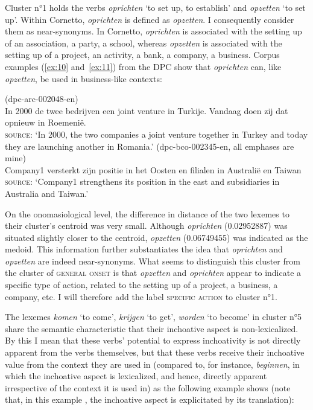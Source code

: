 Cluster n°1 holds the verbs \textit{oprichten} `to set up, to establish' and \textit{opzetten} `to set up'. Within Cornetto, \textit{oprichten} is defined as \textit{opzetten}. I consequently consider them as near-synonyms. In Cornetto, \textit{oprichten} is associated with the setting up of an association, a party, a school, whereas \textit{opzetten} is associated with the setting up of a project, an activity, a bank, a company, a business. Corpus examples (\ref{ex:10} and~\ref{ex:11}) from the DPC show that \textit{oprichten} can, like \textit{opzetten}, be used in business-like contexts:

\ea (dpc-arc-002048-en)\label{ex:10}\\
In 2000  de twee bedrijven een joint venture  in Turkije. Vandaag doen zij dat opnieuw in Roemenië.\smallskip\\\relax
\textsc{source}: `In 2000, the two companies  a joint venture together in Turkey and today they are launching another in Romania.'
\ex (dpc-bco-002345-en, all emphases are mine)\label{ex:11}\\
Company1 versterkt zijn positie in het Oosten en  filialen  in Australië en Taiwan\smallskip\\\relax
\textsc{source}: `Company1 strengthens its position in the east and  subsidiaries in Australia and Taiwan.'
\z

On the onomasiological level, the difference in distance of the two lexemes to their cluster’s centroid was very small. Although \textit{oprichten} (0.02952887) was situated slightly closer to the centroid, \textit{opzetten} (0.06749455) was indicated as the medoid. This information further substantiates the idea that \textit{oprichten} and \textit{opzetten} are indeed near-synonyms. What seems to distinguish this cluster from the cluster of \textsc{general onset} is that \textit{opzetten} and \textit{oprichten} appear to indicate a specific type of action, related to the setting up of a project, a business, a company, etc. I will therefore add the label \textsc{specific action} to cluster n°1.

The lexemes \textit{komen} `to come', \textit{krijgen} `to get', \textit{worden} `to become' in cluster n°5 share the semantic characteristic that their inchoative aspect is non-lexicalized. By this I mean that these verbs’ potential to express inchoativity is not directly apparent from the verbs themselves, but that these verbs receive their inchoative value from the context they are used in (compared to, for instance, \textit{beginnen}, in which the inchoative aspect is lexicalized, and hence, directly apparent irrespective of the context it is used in) as the following example shows (note that, in this example , the inchoative aspect is explicitated by its translation):

